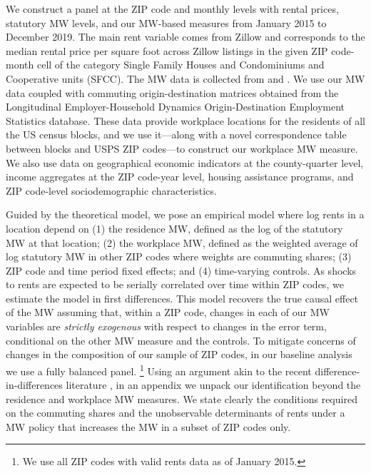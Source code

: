 We construct a panel at the ZIP code and monthly levels with rental prices, 
statutory MW levels, and our MW-based measures from January 2015 to December 2019.
The main rent variable comes from Zillow and corresponds to the median 
rental price per square foot across Zillow listings in the given ZIP 
code-month cell of the category Single Family Houses and Condominiums and 
Cooperative units (SFCC).
The MW data is collected from \textcite{VaghulZipperer2016} and 
\textcite{BerkeleyLaborCenter}.
We use our MW data coupled with commuting origin-destination matrices obtained 
from the Longitudinal Employer-Household Dynamics Origin-Destination Employment 
Statistics \parencite[LODES;][]{CensusLODES} database.
These data provide workplace locations for the residents of all the US census 
blocks, and we use it---along with a novel correspondence table between blocks 
and USPS ZIP codes---to construct our workplace MW measure.
We also use data on 
geographical economic indicators at the county-quarter level, 
income aggregates at the ZIP code-year level,
housing assistance programs, and 
ZIP code-level sociodemographic characteristics.


Guided by the theoretical model, we pose an empirical model where log rents in 
a location depend on
(1) the residence MW, defined as the log of the statutory MW at that location;
(2) the workplace MW, defined as the weighted average of log statutory MW in other 
ZIP codes where weights are commuting shares;
(3) ZIP code and time period fixed effects;
and 
(4) time-varying controls.
As shocks to rents are expected to be serially correlated over time within ZIP 
codes, we estimate the model in first differences.
This model recovers the true causal effect of the MW assuming that, 
within a ZIP code, changes in each of our MW variables are 
\textit{strictly exogenous} with respect to changes in the error 
term, conditional on the other MW measure and the controls.
To mitigate concerns of changes in the composition of our sample of ZIP codes, 
in our baseline analysis we use a fully balanced panel.%
\footnote{We use all ZIP codes with valid rents data as of January 2015.}
Using an argument akin to the recent difference-in-differences literature
\parencite[e.g.,][]{CallawayEtAl2021}, 
in an appendix we unpack our identification beyond the residence and
workplace MW measures.
We state clearly the conditions required on the commuting shares and the 
unobservable determinants of rents under a MW policy that increases the MW in 
a subset of ZIP codes only.

